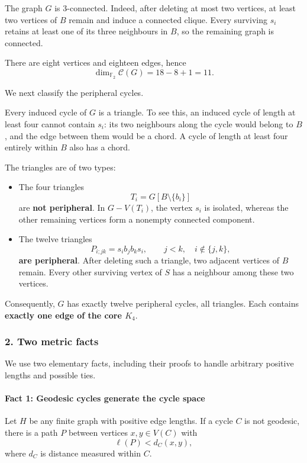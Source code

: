 \documentclass[
  11pt,
  a4paper,
]{article}
\newcounter{none} %
\begin{document}
The graph \(G\) is 3-connected. Indeed, after deleting at most two
vertices, at least two vertices of \(B\) remain and induce a connected
clique. Every surviving \(s_i\) retains at least one of its three
neighbours in \(B\), so the remaining graph is connected.

There are eight vertices and eighteen edges, hence \[
\dim_{\mathbb F_2}\mathcal C(G)=18-8+1=11.
\]

We next classify the peripheral cycles.

Every induced cycle of \(G\) is a triangle. To see this, an induced
cycle of length at least four cannot contain \(s_i\): its two neighbours
along the cycle would belong to \(B\), and the edge between them would
be a chord. A cycle of length at least four entirely within \(B\) also
has a chord.

The triangles are of two types:

\begin{itemize}
\item
  The four triangles \[
  T_i=G[B\setminus\{b_i\}]
  \] are \textbf{not peripheral}. In \(G-V(T_i)\), the vertex \(s_i\) is
  isolated, whereas the other remaining vertices form a nonempty
  connected component.
\item
  The twelve triangles \[
  P_{i;jk}=s_i b_j b_k s_i,
  \qquad j<k,\quad i\notin\{j,k\},
  \] \textbf{are peripheral}. After deleting such a triangle, two
  adjacent vertices of \(B\) remain. Every other surviving vertex of
  \(S\) has a neighbour among these two vertices.
\end{itemize}

Consequently, \(G\) has exactly twelve peripheral cycles, all triangles.
Each contains \textbf{exactly one edge of the core \(K_4\)}.

\subsubsection{2. Two metric facts}\label{two-metric-facts}

We use two elementary facts, including their proofs to handle arbitrary
positive lengths and possible ties.

\paragraph{Fact 1: Geodesic cycles generate the cycle
space}\label{fact-1-geodesic-cycles-generate-the-cycle-space}

Let \(H\) be any finite graph with positive edge lengths. If a cycle
\(C\) is not geodesic, there is a path \(P\) between vertices
\(x,y\in V(C)\) with \[
\ell(P)<d_C(x,y),
\] where \(d_C\) is distance measured within \(C\).
\end{document}
